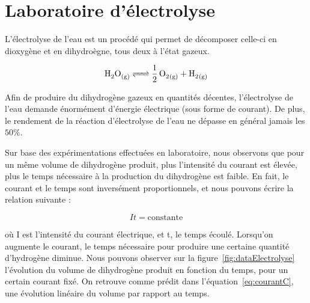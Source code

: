 \section{Laboratoire d’électrolyse}

L'électrolyse de l'eau est un procédé qui permet de décomposer 
celle-ci en dioxygène et en dihydroègne, tous deux à l'état gazeux.

\begin{equation*}
	\ce{H2O_{(g)} <=> \frac{1}{2} \, O2_{(g)} + H2_{(g)}} 
\end{equation*}

Afin de produire du dihydrogène gazeux en quantités décentes, l'électrolyse de l'eau 
demande énormément d'énergie électrique (sous forme de courant). De plus, le rendement
de la réaction d'électrolyse de l'eau ne dépasse en général jamais les $50\%$.

Sur base des expérimentations effectuées en laboratoire, nous observons que pour un même volume de dihydrogène produit, 
plus l’intensité du courant est élevée, plus le temps nécessaire à la production
du dihydrogène est faible. En fait, le courant et le temps sont inversément proportionnels, 
et nous pouvons écrire la relation suivante :

\begin{equation}
	It = \text{constante}
	\label{eq:courantC}
\end{equation}

où I est l'intensité du courant électrique, et t, le temps écoulé.
Lorsqu'on augmente le courant, 
le temps nécessaire pour produire une certaine quantité d'hydrogène diminue.
Nous pouvons observer sur la figure~\ref{fig:dataElectrolyse} 
l'évolution du volume de dihydrogène produit en fonction du temps,
pour un certain courant fixé.
On retrouve comme prédit dans l'équation~\ref{eq:courantC},
une évolution linéaire du volume par rapport au temps.


